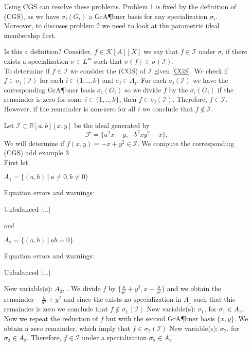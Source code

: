 \documentclass[runningheads]{llncs}
\newcommand{\1}{\chi}
\begin{document}
Using CGS can resolve these problems. Problem 1 is fixed by the definition of (CGS), as we have \(\sigma_i(G_i)\) a 
 GrA¶bner basis for any specialization \(\sigma_i\). Moreover, 
 to discuses problem 2 we need to look at the parametric ideal membership first.

{\color{red} Is this a definition?}
 Consider, \(f\in \mathcal{K}[A][X]\) we say that \(f\in\mathcal{I}\) under \(\sigma\), if there exists a specialization 
 \(\sigma\in L^m\) such that \(\sigma(f)\in\sigma(\mathcal{I})\).\\

To determine if \(f\in\mathcal{I}\) we consider the (CGS) of \(\mathcal{I}\) given \ref{CGS}. 
We check if \(f\in\sigma_i(\mathcal{I})\) for each \(i\in\{1,..,k\}\) and \(\sigma_i\in A_i\).
For each \(\sigma_i(\mathcal{I})\) we have the corresponding GrA¶bner basis \(\sigma_i(G_i)\)
so we divide \(f\) by the \(\sigma_i(G_i)\) if the remainder is zero for some \(i\in\{1,..,k\}\),
then \(f\in\sigma_i(\mathcal{I})\). Therefore, \(f\in\mathcal{I}\). However, if the remainder is non-zero for all \(i\) we conclude that 
\(f\notin\mathcal{I}\).

\begin{example}
	Let \(\mathcal{I}\subset \mathbb{R}[a,b][x,y]\) be the ideal generated by 
    \[\mathcal{F}=\{a^2 x - y, -b^2 x y^2 - x\}.\]
	We will determine if \(f(x,y)=-x+y^2\in\mathcal{I}\).
	We compute the corresponding (CGS)
	{\color{red} add example 3}\\
	First let {\color{red} \(A_1=\{(a,b)~|~ a\ne 0, b\ne 0\}\)

  Equation errors and warnings:

 Unbalanced $|\hdots|$}

 and {\color{red} \(A_2=\{(a,b)~|~ ab=0\}\)

  Equation errors and warnings:

 Unbalanced $|\hdots|$}


{\color{blue} New variable(s): \(A_2\),  }
. 
	We divide \(f\) by \(\{\frac{y}{b^2}+y^3,x-\frac{y}{a^2}\}\) and we obtain the remainder \(-\frac{y}{a^2}+y^2\) and 
	since the exists no specialization in \(A_1\) such that this remainder is zero we conclude that \(f\notin \sigma_1(\mathcal{I})\)
{\color{blue} New variable(s): \(\sigma _1\),  }
 for
	\(\sigma_1\in A_1\). Now we repeat the reduction of \(f\) but with the second GrA¶bner basis \(\{x,y\}\). We obtain a zero remainder, which imply that 
	\(f\in \sigma_2(\mathcal{I})\)
{\color{blue} New variable(s): \(\sigma _2\),  }
 for \(\sigma_2\in A_2\). Therefore, \(f\in\mathcal{I}\) under a specialization \(\sigma_2\in A_2\).
\end{example}
\end{document}
